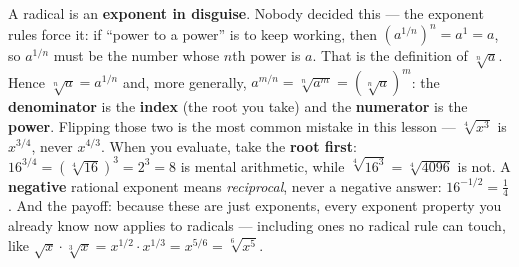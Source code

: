 \documentclass[10pt]{article}
\begin{document}
\vspace{0.10in}

\begin{remindbox}
\small A radical is an \textbf{exponent in disguise}. Nobody decided this --- the exponent rules
force it: if ``power to a power'' is to keep working, then $\left(a^{1/n}\right)^{n}=a^{1}=a$, so
$a^{1/n}$ must be the number whose $n$th power is $a$. That is the definition of
$\sqrt[n]{a}$. Hence $\sqrt[n]{a}=a^{1/n}$ and, more generally,
$a^{m/n}=\sqrt[n]{a^{m}}=\left(\sqrt[n]{a}\right)^{m}$: the \textbf{denominator} is the
\textbf{index} (the root you take) and the \textbf{numerator} is the \textbf{power}. Flipping those
two is the most common mistake in this lesson --- $\sqrt[4]{x^{3}}$ is $x^{3/4}$, never $x^{4/3}$.
When you evaluate, take the \textbf{root first}: $16^{3/4}=\left(\sqrt[4]{16}\right)^{3}=2^{3}=8$ is
mental arithmetic, while $\sqrt[4]{16^{3}}=\sqrt[4]{4096}$ is not. A \textbf{negative} rational
exponent means \emph{reciprocal}, never a negative answer: $16^{-1/2}=\frac{1}{4}$. And the payoff:
because these are just exponents, every exponent property you already know now applies to radicals
--- including ones no radical rule can touch, like
$\sqrt{x}\cdot\sqrt[3]{x}=x^{1/2}\cdot x^{1/3}=x^{5/6}=\sqrt[6]{x^{5}}$.
\end{remindbox}
\end{document}
